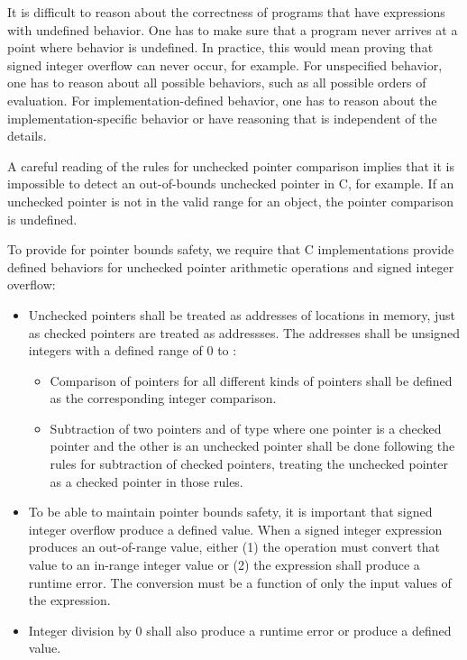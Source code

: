 It is difficult to reason about the correctness of programs that have
expressions with undefined behavior. One has to make sure that a program
never arrives at a point where behavior is undefined. In practice, this
would mean proving that signed integer overflow can never occur, for
example. For unspecified behavior, one has to reason about all possible
behaviors, such as all possible orders of evaluation. For
implementation-defined behavior, one has to reason about the
implementation-specific behavior or have reasoning that is independent
of the details.

A careful reading of the rules for unchecked pointer comparison implies
that it is impossible to detect an out-of-bounds unchecked pointer in C,
for example. If an unchecked pointer  is not in the valid range for an
object, the pointer comparison is undefined.

To provide for pointer bounds safety, we require that C implementations
provide defined behaviors for unchecked pointer arithmetic operations and
signed integer overflow:

\begin{itemize}
\item
  Unchecked pointers shall be treated as addresses of locations in memory,
  just as checked pointers are treated as addressses. The addresses shall
  be unsigned integers with a defined range of 0 to
  :

  \begin{itemize}
  \item
    Comparison of pointers for all different kinds of pointers shall be
    defined as the corresponding integer comparison.
  \item
    Subtraction  \code{-}  of two pointers  and 
    of type  where one
    pointer is a checked pointer and the other is an unchecked pointer shall
    be done following the rules for subtraction of checked pointers,
    treating the unchecked pointer as a checked pointer in those rules.
  \end{itemize}
\end{itemize}

\begin{itemize}
\item
  To be able to maintain pointer bounds safety, it is important that
  signed integer overflow produce a defined value. When a signed integer
  expression produces an out-of-range value, either (1) the operation
  must convert that value to an in-range integer value or (2) the
  expression shall produce a runtime error. The conversion must be a
  function of only the input values of the expression.
\item
  Integer division by 0 shall also produce a runtime error or produce a
  defined value.
\end{itemize}

